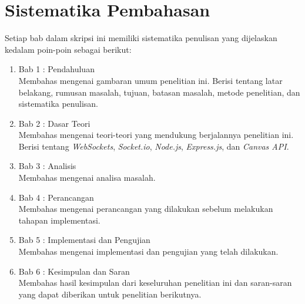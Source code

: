 \section{Sistematika Pembahasan}
\label{sec:sispem}
Setiap bab dalam skripsi ini memiliki sistematika penulisan yang dijelaskan kedalam poin-poin sebagai berikut:

\begin{enumerate}
	\item Bab 1 : Pendahuluan \\
	Membahas mengenai gambaran umum penelitian ini. Berisi tentang latar belakang, rumusan masalah, tujuan, batasan masalah, metode penelitian, dan sistematika penulisan.
	
	\item Bab 2 : Dasar Teori \\
	Membahas mengenai teori-teori yang mendukung berjalannya penelitian ini. Berisi tentang \textit{WebSockets}, \textit{Socket.io}, \textit{Node.js},  \textit{Express.js}, dan \textit{Canvas API}.
	
	\item Bab 3 : Analisis \\
	Membahas mengenai analisa masalah.
	
	\item Bab 4 : Perancangan \\
	Membahas mengenai perancangan yang dilakukan sebelum melakukan tahapan implementasi.
	
	\item Bab 5 : Implementasi dan Pengujian \\
	Membahas mengenai implementasi dan pengujian yang telah dilakukan.
	
	\item Bab 6 : Kesimpulan dan Saran \\
	Membahas hasil kesimpulan dari keseluruhan penelitian ini dan saran-saran yang dapat diberikan untuk penelitian berikutnya.
\end{enumerate}